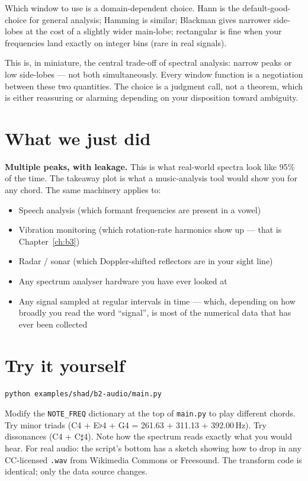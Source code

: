 \documentclass[11pt,a4paper,openany]{book}
\begin{document}
Which window to use is a domain-dependent choice. Hann is the
default-good-choice for general analysis; Hamming is similar; Blackman gives
narrower side-lobes at the cost of a slightly wider main-lobe; rectangular is
fine when your frequencies land exactly on integer bins (rare in real signals).

This is, in miniature, the central trade-off of spectral analysis: narrow peaks
or low side-lobes --- not both simultaneously. Every window function is a
negotiation between these two quantities. The choice is a judgment call, not a
theorem, which is either reassuring or alarming depending on your disposition
toward ambiguity.

\section{What we just did}

\textbf{Multiple peaks, with leakage.} This is what real-world spectra look
like 95\% of the time. The takeaway plot is what a music-analysis tool would
show you for any chord. The same machinery applies to:
\begin{itemize}[leftmargin=*,itemsep=0pt]
\item Speech analysis (which formant frequencies are present in a vowel)
\item Vibration monitoring (which rotation-rate harmonics show up --- that
  is Chapter~\ref{ch:b3})
\item Radar / sonar (which Doppler-shifted reflectors are in your sight line)
\item Any spectrum analyser hardware you have ever looked at
\item Any signal sampled at regular intervals in time --- which, depending on
  how broadly you read the word ``signal'', is most of the numerical data that
  has ever been collected
\end{itemize}

\section{Try it yourself}

\begin{lstlisting}[style=shaddata]
python examples/shad/b2-audio/main.py
\end{lstlisting}

Modify the \texttt{NOTE\_FREQ} dictionary at the top of \texttt{main.py} to
play different chords. Try minor triads (C4 + E$\flat$4 + G4 = 261.63 +
311.13 + 392.00\,Hz). Try dissonances (C4 + C$\sharp$4). Note how the
spectrum reads exactly what you would hear. For real audio: the script's
bottom has a sketch showing how to drop in any CC-licensed \texttt{.wav}
from Wikimedia Commons or Freesound. The transform code is identical; only
the data source changes.
\end{document}

